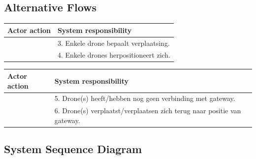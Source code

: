 \documentclass[a4paper, 11pt, oneside]{report}
\begin{document}
\subsection{Alternative Flows}


\begin{table}[H]
	\centering
	\begin{tabular}{|l|l|}
		\hline
		\rowcolor[HTML]{C0C0C0} 
		Actor action  & System responsibility   \\ \hline
	    &  3. Enkele drone bepaalt verplaatsing.     \\ \hline
        &  4. Enkele drones herpositioneert zich.	    \\ \hline
	\end{tabular}
\end{table}

\begin{table}[H]
	\centering
	\begin{tabular}{|l|l|}
		\hline
		\rowcolor[HTML]{C0C0C0} 
		Actor action  & System responsibility   \\ \hline
		&  5. Drone(s) heeft/hebben nog geen verbinding met gateway.     \\ \hline
		&  6. Drone(s) verplaatst/verplaatsen zich terug naar positie van gateway.	    \\ \hline
	\end{tabular}
\end{table}

\subsection{System Sequence Diagram }
\label{Usecase:noodprotocol:systemsequence}
\end{document}
